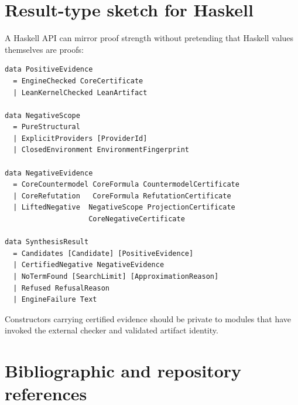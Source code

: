 \documentclass[11pt,letterpaper,openany]{report}
\theoremstyle{definition}
\theoremstyle{remark}
\begin{document}
\chapter{Result-type sketch for Haskell}
\label{app:haskell-result}

A Haskell API can mirror proof strength without pretending that Haskell values themselves are proofs:

\begin{lstlisting}[language=HaskellLite,caption={Illustrative evidence-aware result type.}]
data PositiveEvidence
  = EngineChecked CoreCertificate
  | LeanKernelChecked LeanArtifact

data NegativeScope
  = PureStructural
  | ExplicitProviders [ProviderId]
  | ClosedEnvironment EnvironmentFingerprint

data NegativeEvidence
  = CoreCountermodel CoreFormula CountermodelCertificate
  | CoreRefutation   CoreFormula RefutationCertificate
  | LiftedNegative  NegativeScope ProjectionCertificate
                    CoreNegativeCertificate

data SynthesisResult
  = Candidates [Candidate] [PositiveEvidence]
  | CertifiedNegative NegativeEvidence
  | NoTermFound [SearchLimit] [ApproximationReason]
  | Refused RefusalReason
  | EngineFailure Text
\end{lstlisting}

Constructors carrying certified evidence should be private to modules that have invoked the external checker and validated artifact identity.

\chapter{Bibliographic and repository references}
\end{document}

